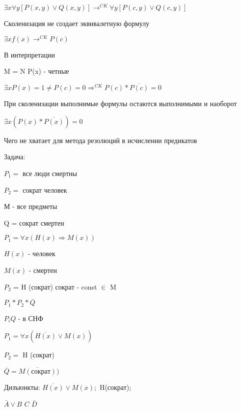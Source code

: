 \documentclass[russian]{lecture-notes}
\begin{document}
    \begin{example}

        $\exists x \forall y [P(x,y) \lor Q(x,y)] \rightarrow^{CK} \forall y [P(c,y) \lor Q(c,y)]$

        \begin{remark}

            Сколенизация не создает эквивалетную формулу

            \end{remark}

        $\exists x f(x) \rightarrow^{CK} P(c)$

        В интерпретации

        M = N \quad P(x) - четные

        $\exists x P(x) = 1 \neq P(c) = 0 \Rightarrow^{CK} P(c) * \overline{P(c)} = 0 $

        \begin{theorem}

        При сколенизации выполнимые формулы остаются выполнимыми и наоборот

        \end{theorem}

    \begin{example}

        $\exists x (P(x) * \overline{P(x)}) = 0 $

        \end{example}


        Чего не хватает для метода резолюций в исчислении предикатов


        Задача:

        $P_{1} = $ все люди смертны

        $P_{2} = $ сократ человек

        М - все предметы

        Q = сократ смертен

        $P_{1} = \forall x (H(x) \Rightarrow M(x))$

        $H(x) $ - человек

        $M(x)$ - смертен

        $P_2$ = H (сократ) \quad \quad сократ - const $\in$ M

        $P_{1} * P_{2} * \overline{Q}$

        $P_{i}Q$ - в СНФ

        $P_{1} = \forall x (\overline{H(x)} \lor M(x))$

        $P_{2} = $ H (сократ)

        $\overline{Q} = \overline{M(сократ)})$

        Дизъюнкты: $\overline{H(x)} \lor M(x);$ H(сократ); 

        \qquad \qquad \qquad $\bar{A} \lor B$ \qquad \qquad $C$ \qquad \qquad $\bar{D}$

        \end{example}
\end{document}
